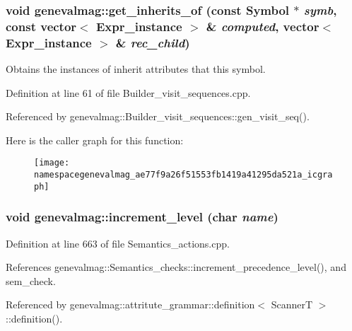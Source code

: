 \hypertarget{namespacegenevalmag_ae77f9a26f51553fb1419a41295da521a}{
\subsubsection[{get\_\-inherits\_\-of}]{\setlength{\rightskip}{0pt plus 5cm}void genevalmag::get\_\-inherits\_\-of (const Symbol $\ast$ {\em symb}, \/  const vector$<$ Expr\_\-instance $>$ \& {\em computed}, \/  vector$<$ Expr\_\-instance $>$ \& {\em rec\_\-child})}}
\label{namespacegenevalmag_ae77f9a26f51553fb1419a41295da521a}
Obtains the instances of inherit attributes that this symbol. 

Definition at line 61 of file Builder\_\-visit\_\-sequences.cpp.



Referenced by genevalmag::Builder\_\-visit\_\-sequences::gen\_\-visit\_\-seq().



Here is the caller graph for this function:\nopagebreak
\begin{figure}[H]
\begin{center}
\leavevmode
\texttt{[image: namespacegenevalmag\_ae77f9a26f51553fb1419a41295da521a\_icgraph]}
\end{center}
\end{figure}


\hypertarget{namespacegenevalmag_a0cd76ff96d0edddb2332eb74a4085ab5}{
\subsubsection[{increment\_\-level}]{\setlength{\rightskip}{0pt plus 5cm}void genevalmag::increment\_\-level (char {\em name})}}
\label{namespacegenevalmag_a0cd76ff96d0edddb2332eb74a4085ab5}


Definition at line 663 of file Semantics\_\-actions.cpp.



References genevalmag::Semantics\_\-checks::increment\_\-precedence\_\-level(), and sem\_\-check.



Referenced by genevalmag::attritute\_\-grammar::definition$<$ ScannerT $>$::definition().



